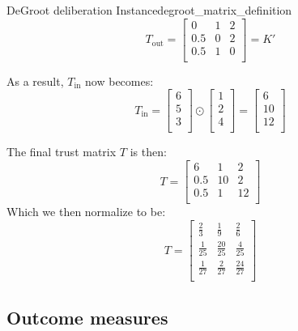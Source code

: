 \begin{example}{DeGroot deliberation Instance}{degroot_matrix_definition}
	$$T_{\text{out}} = \begin{bmatrix}
			0   & 1 & 2 \\
			0.5 & 0 & 2 \\
			0.5 & 1 & 0 \\
		\end{bmatrix} = K'$$

	As a result, $T_{\text{in}}$ now becomes:
	$$T_{\text{in}} = \begin{bmatrix}
			6 \\
			5 \\
			3 \\
		\end{bmatrix} \odot
		\begin{bmatrix}
			1 \\
			2 \\
			4 \\
		\end{bmatrix} = \begin{bmatrix}
			6  \\
			10 \\
			12 \\
		\end{bmatrix} $$

	The final trust matrix $T$ is then:
	$$T = \begin{bmatrix}
			6   & 1  & 2  \\
			0.5 & 10 & 2  \\
			0.5 & 1  & 12 \\
		\end{bmatrix}$$
	Which we then normalize to be:
	$$T = \begin{bmatrix}
			\frac{2}{3}  & \frac{1}{9}   & \frac{2}{6}   \\
			\frac{1}{25} & \frac{20}{25} & \frac{4}{25}  \\
			\frac{1}{27} & \frac{2}{27}  & \frac{24}{27} \\
		\end{bmatrix}
	$$

\end{example}

\subsection{Outcome measures}

